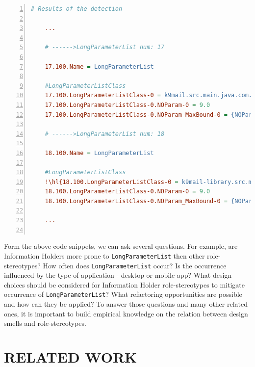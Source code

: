 \documentclass[AMA,Times1COL]{WileyNJDv5} %
\begin{document}
\begin{lstlisting}[language={ini}, mathescape, backgroundcolor=\color{gray!10}, frame=trlb,caption={\footnotesize Example {\tt LongParameterList} design smell detected from K9 Mail project using SAD tool. Line {\tt 19} shows {\tt ImageStoreSettings.java} class\label{lst:dscode}}, numbers=left, escapechar=!,tabsize=2]
	# Results of the detection 
	
	...
	
	# ------>LongParameterList num: 17
	
	17.100.Name = LongParameterList
	
	#LongParameterListClass
	17.100.LongParameterListClass-0 = k9mail.src.main.java.com.fsck.k9.activity.compose.RecipientPresenter
	17.100.LongParameterListClass-0.NOParam-0 = 9.0
	17.100.LongParameterListClass-0.NOParam_MaxBound-0 = {NOParam_MaxBound=6.0}
	
	# ------>LongParameterList num: 18
	
	18.100.Name = LongParameterList
	
	#LongParameterListClass
	!\hl{18.100.LongParameterListClass-0 = k9mail-library.src.main.java.com.fsck.k9.mail.store.imap.ImapStoreSettings}!
	18.100.LongParameterListClass-0.NOParam-0 = 9.0
	18.100.LongParameterListClass-0.NOParam_MaxBound-0 = {NOParam_MaxBound=6.0}
	
	...
	
\end{lstlisting}
Form the above code snippets, we can ask several questions. For example, are Information Holders more prone to {\tt LongParameterList} then other role-stereotypes? How often does {\tt LongParameterList} occur? Is the occurrence influenced by the type of application - desktop or mobile app? What design choices should be considered for Information Holder role-stereotypes to mitigate occurrence of {\tt LongParameterList}? What refactoring opportunities are possible and how can they be applied? To answer those questions and many other related ones, it is important to build empirical knowledge on the relation between design smells and role-stereotypes. 

\section{RELATED WORK}\label{sec:relatedwork}
\end{document}
